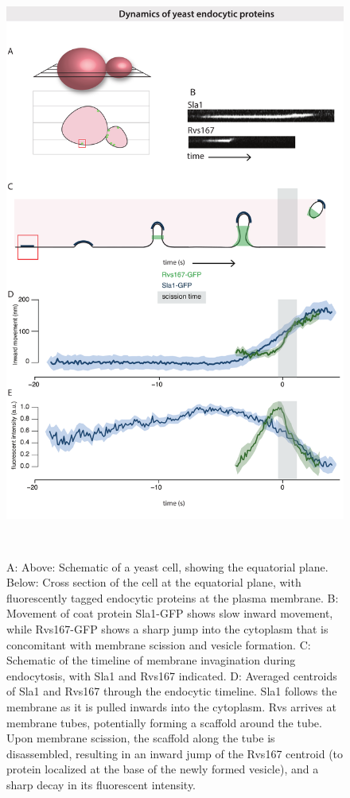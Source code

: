 	\begin{figure}
	\centering
	\includegraphics[width=19.5cm,height=19.5cm,keepaspectratio, valign=t]{figures/results_final/yeast_schemat_fig1_C}
	\caption[Centroid tracking yeast endocytic proteins]
	{A: Above: Schematic of a yeast cell, showing the equatorial plane. Below: Cross section of the cell at the equatorial plane, with fluorescently tagged endocytic proteins at the plasma membrane. B: Movement of coat protein Sla1-GFP shows slow inward movement, while Rvs167-GFP shows a sharp jump into the cytoplasm that is concomitant with membrane scission and vesicle formation.
	C: Schematic of the timeline of membrane invagination during endocytosis, with Sla1 and Rvs167 indicated. D: Averaged centroids of Sla1 and Rvs167 through the endocytic timeline. Sla1 follows the membrane as it is pulled inwards into the cytoplasm. Rvs arrives at membrane tubes, potentially forming a scaffold around the tube. Upon membrane scission, the scaffold along the tube is disassembled, resulting in an inward jump of the Rvs167 centroid (to protein localized at the base of the newly formed vesicle), and a sharp decay in its fluorescent intensity. 
	\label{fig1_schematic}}
	\end{figure}

